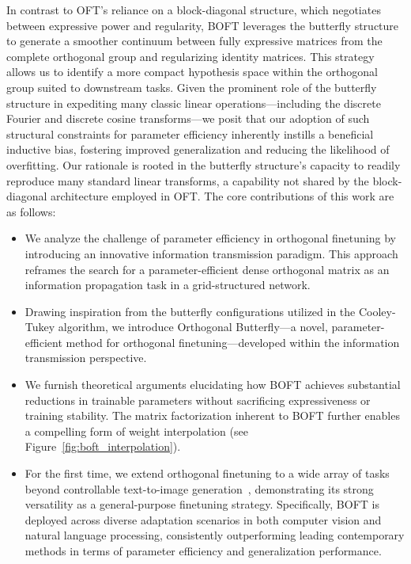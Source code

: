 In contrast to OFT's reliance on a block-diagonal structure, which negotiates between expressive power and regularity, BOFT leverages the butterfly structure to generate a smoother continuum between fully expressive matrices from the complete orthogonal group and regularizing identity matrices. This strategy allows us to identify a more compact hypothesis space within the orthogonal group suited to downstream tasks. Given the prominent role of the butterfly structure in expediting many classic linear operations—including the discrete Fourier and discrete cosine transforms—we posit that our adoption of such structural constraints for parameter efficiency inherently instills a beneficial inductive bias, fostering improved generalization and reducing the likelihood of overfitting. Our rationale is rooted in the butterfly structure’s capacity to readily reproduce many standard linear transforms, a capability not shared by the block-diagonal architecture employed in OFT. The core contributions of this work are as follows:

\begin{itemize}[leftmargin=*,nosep]
    \item We analyze the challenge of parameter efficiency in orthogonal finetuning by introducing an innovative information transmission paradigm. This approach reframes the search for a parameter-efficient dense orthogonal matrix as an information propagation task in a grid-structured network.
    \item Drawing inspiration from the butterfly configurations utilized in the Cooley-Tukey algorithm, we introduce Orthogonal Butterfly—a novel, parameter-efficient method for orthogonal finetuning—developed within the information transmission perspective.
    \item We furnish theoretical arguments elucidating how BOFT achieves substantial reductions in trainable parameters without sacrificing expressiveness or training stability. The matrix factorization inherent to BOFT further enables a compelling form of weight interpolation (see Figure~\ref{fig:boft_interpolation}).
    \item For the first time, we extend orthogonal finetuning to a wide array of tasks beyond controllable text-to-image generation~\cite{qiu2023controlling}, demonstrating its strong versatility as a general-purpose finetuning strategy. Specifically, BOFT is deployed across diverse adaptation scenarios in both computer vision and natural language processing, consistently outperforming leading contemporary methods in terms of parameter efficiency and generalization performance.
\end{itemize}

